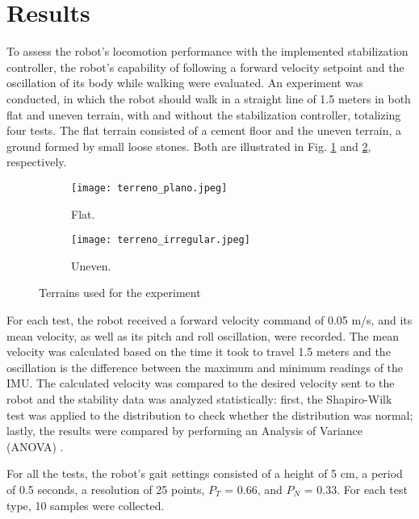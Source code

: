 \documentclass[conference]{IEEEtran}
\begin{document}
\section{Results}

To assess the robot's locomotion performance with the implemented stabilization controller, the robot's capability of following a forward velocity setpoint and the oscillation of its body while walking were evaluated. An experiment was conducted, in which the robot should walk in a straight line of 1.5 meters in both flat and uneven terrain, with and without the stabilization controller, totalizing four tests. The flat terrain consisted of a cement floor and the uneven terrain, a ground formed by small loose stones. Both are illustrated in Fig. \ref{fig:terreno_plano} and \ref{fig:terreno_uneven}, respectively.

\begin{figure}[htbp]
  \centering
  \begin{subfigure}[htbp]{0.24\textwidth}
    \centering
    \texttt{[image: terreno\_plano.jpeg]}
    \caption{Flat.}
    \label{fig:terreno_plano}
  \end{subfigure}
  \begin{subfigure}[htbp]{0.24\textwidth}
    \centering
    \texttt{[image: terreno\_irregular.jpeg]}
    \caption{Uneven.}
    \label{fig:terreno_uneven}
  \end{subfigure}
  \vfill
  \caption{Terrains used for the experiment}
  \label{fig:terrenos}
\end{figure}

For each test, the robot received a forward velocity command of 0.05 m/s, and its mean velocity, as well as its pitch and roll oscillation, were recorded. The mean velocity was calculated based on the time it took to travel 1.5 meters and the oscillation is the difference between the maximum and minimum readings of the IMU. The calculated velocity was compared to the desired velocity sent to the robot and the stability data was analyzed statistically: first, the Shapiro-Wilk test \cite{leotti2005comparaccao} was applied to the distribution to check whether the distribution was normal; lastly, the results were compared by performing an Analysis of Variance (ANOVA) \cite{cano2012six}.

For all the tests, the robot's gait settings consisted of a height of 5 cm, a period of 0.5 seconds, a resolution of 25 points, $P_T$ = 0.66, and $P_N$ = 0.33. For each test type, 10 samples were collected.
\end{document}
